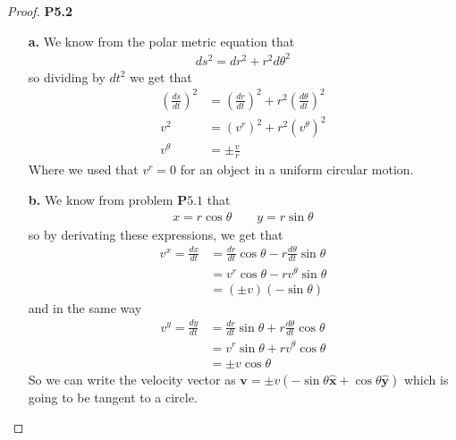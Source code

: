 \documentclass[11pt]{article}
\theoremstyle{definition}
\begin{document}
\cleardoublepage
\begin{proof}{\textbf{P5.2}}
\begin{itemize}
    \item[\bf{a.}] We know from the polar metric equation that
    \begin{align*}
        ds^2 = dr^2 + r^2 d\theta^2
    \end{align*}
    so dividing by $dt^2$ we get that
    \begin{align*}
        \left(\frac{ds}{dt}\right)^2 &=
        \left(\frac{dr}{dt}\right)^2 + r^2 \left(\frac{d\theta}{dt}\right)^2\\
        v^2 &= (v^r)^2 + r^2 (v^\theta)^2\\
        v^\theta &= \pm\frac{v}{r}
    \end{align*}
    Where we used that $v^r = 0$ for an object in a uniform circular motion.

    \item[\bf{b.}] We know from problem $\bm{P5.1}$ that
    \begin{align*}
        x = r\cos\theta \quad\quad y = r\sin\theta
    \end{align*}
    so by derivating these expressions, we get that
    \begin{align*}
        v^x = \frac{dx}{dt} &= \frac{dr}{dt}\cos\theta - r\frac{d\theta}{dt}\sin\theta\\
        &= v^r \cos\theta - rv^\theta\sin\theta\\
        &= (\pm v)(-\sin\theta)
    \end{align*}
    and in the same way
    \begin{align*}
        v^y = \frac{dy}{dt} &= \frac{dr}{dt}\sin\theta + r\frac{d\theta}{dt}\cos\theta\\
        &= v^r \sin\theta + rv^\theta\cos\theta\\
        &= \pm v \cos\theta
    \end{align*}
    So we can write the velocity vector as
    $\bm{v} = \pm v(-\sin\theta\bm{\hat{x}} + \cos\theta\bm{\hat{y}})$
    which is going to be tangent to a circle.
\end{itemize}
\end{proof}
\cleardoublepage
\end{document}
